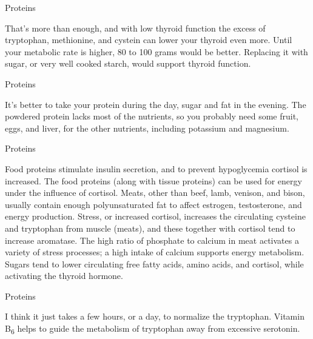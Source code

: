 \documentclass[11pt,oneside,openany,extrafontsizes]{memoir}
\begin{document}
\begin{standalonequote}{Proteins}

    \begin{answer}
        That's more than enough, and with low thyroid function the excess of tryptophan, methionine, and cystein can lower your thyroid even more. Until your metabolic rate is higher, 80 to 100 grams would be better. Replacing it with sugar, or very well cooked starch, would support thyroid function.
    \end{answer}
\end{standalonequote}

\begin{standalonequote}{Proteins}

    \begin{answer}
        It's better to take your protein during the day, sugar and fat in the evening. The powdered protein lacks most of the nutrients, so you probably need some fruit, eggs, and liver, for the other nutrients, including potassium and magnesium.
    \end{answer}
\end{standalonequote}

\begin{standalonequote}{Proteins}

    \begin{answer}
        Food proteins stimulate insulin secretion, and to prevent hypoglycemia cortisol is increased. The food proteins (along with tissue proteins) can be used for energy under the influence of cortisol. Meats, other than beef, lamb, venison, and bison, usually contain enough polyunsaturated fat to affect estrogen, testosterone, and energy production. Stress, or increased cortisol, increases the circulating cysteine and tryptophan from muscle (meats), and these together with cortisol tend to increase aromatase. The high ratio of phosphate to calcium in meat activates a variety of stress processes; a high intake of calcium supports energy metabolism. Sugars tend to lower circulating free fatty acids, amino acids, and cortisol, while activating the thyroid hormone.
    \end{answer}
\end{standalonequote}

\begin{standalonequote}{Proteins}

    \begin{answer}
        I think it just takes a few hours, or a day, to normalize the tryptophan. Vitamin B\textsubscript{6} helps to guide the metabolism of tryptophan away from excessive serotonin.
    \end{answer}
\end{standalonequote}
\end{document}
